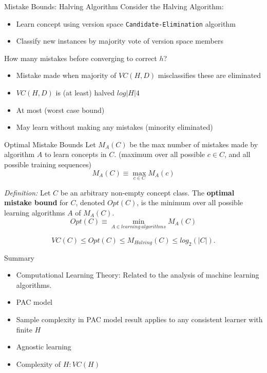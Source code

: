 \documentclass[%
pdf,
colorBG,
slideColor,
tcrico,
]{prosper}
\begin{document}
\begin{slide}{Mistake Bounds: Halving Algorithm }
\tiny 
Consider the Halving Algorithm:
\begin{itemize}
\item Learn concept using version space \texttt{Candidate-Elimination} algorithm
\item Classify new instances by majority vote of version space members
\end{itemize}

How many mistakes before converging to correct $h$?
\begin{itemize}
\item Mistake made when majority of $VC(H,D)$ misclassifies these are eliminated 
\item  $VC(H,D)$ is (at least) halved $log|H|4$ 
\item At most (worst case bound) 
\item May learn without making any mistakes (minority eliminated)
\end{itemize}
\end{slide}


\begin{slide}{Optimal Mistake Bounds }
\tiny 
Let $M_{A}(C)$ be the max number of mistakes made by algorithm $A$ to learn
concepts in $C$.  (maximum over all possible $c \in C$, and all possible
training sequences)
\[M_{A}(C) \equiv \max_{c \in C} M_{A}(c)\]


{\em Definition:} Let $C$ be an arbitrary non-empty concept class.  The {\bf
optimal mistake bound} for $C$, denoted $Opt(C)$, is the minimum over all
possible learning algorithms $A$ of $M_{A}(C)$.
\[Opt(C) \equiv \min_{A \in learning\  algorithms} M_{A}(C) \]


\[  VC(C) \leq Opt(C) \leq M_{Halving}(C) \leq log_{2}(|C|). \]
\end{slide}



\begin{slide}{Summary}
\begin{itemize}
\item Computational Learning Theory: Related to the analysis of machine learning algorithms.
 \item  PAC model
\item  Sample complexity in PAC model result applies to any consistent learner with finite $H$
\item Agnostic learning
\item Complexity of $H: VC(H)$
\end{itemize}

\end{slide}

\end{document}
